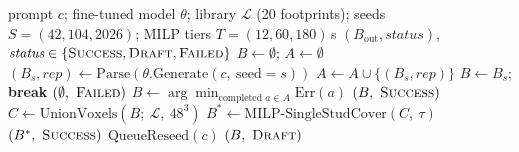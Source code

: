 \begin{algorithm}[tb]
\caption{BrickForma inference and refinement}
\label{alg:inference-refinement}
\small
\begin{algorithmic}[1]
\REQUIRE prompt $c$; fine-tuned model $\theta$; library $\mathcal{L}$ (20 footprints); seeds $S=(42,104,2026)$; MILP tiers $T=(12,60,180)$\,s
\ENSURE $(B_{\mathrm{out}}, \textit{status})$, $\textit{status}\in\{\textsc{Success},\textsc{Draft},\textsc{Failed}\}$
\STATE $B \gets \emptyset$; $A \gets \emptyset$
  \STATE $(B_s,\textit{rep}) \gets \mathrm{Parse}(\theta.\mathrm{Generate}(c,\ \mathrm{seed}{=}s))$
  \STATE $A \gets A \cup \{(B_s,\textit{rep})\}$
    \STATE $B \gets B_s$; \textbf{break}
  \ENDIF
\ENDFOR
{}
    \RETURN $(\emptyset,\ \textsc{Failed})$
  \ENDIF
  \STATE $B \gets \arg\min_{\text{completed } a\in A} \mathrm{Err}(a)$
\ENDIF
{}
  \RETURN $(B,\ \textsc{Success})$ 
\ENDIF
\STATE $C \gets \mathrm{UnionVoxels}(B;\ \mathcal{L},\ 48^3)$ 
  \STATE $B^{*} \gets \mathrm{MILP\text{-}SingleStudCover}(C,\ \tau)$
    \RETURN $(B^{*},\ \textsc{Success})$
  \ENDIF
\ENDFOR
\STATE $\mathrm{QueueReseed}(c)$
\RETURN $(B,\ \textsc{Draft})$ 
\end{algorithmic}
\end{algorithm}
